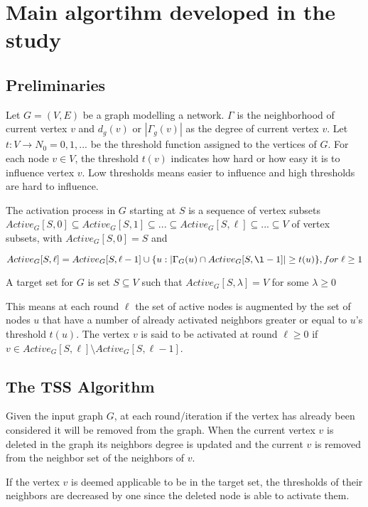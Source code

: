 \section{Main algortihm developed in the study}
\subsection{Preliminaries}
	Let $G = (V,E)$ be a graph modelling a network. $\Gamma$ is the neighborhood of current vertex $v$ and $d_{g}(v)$ or $|\Gamma_{g}(v)|$ as the degree of current vertex $v$.
	Let $t: V \rightarrow N_{0}={0,1,...}$ be the threshold function assigned to the vertices of $G$. For each node $v \in V$, the threshold $t(v)$ indicates how hard or how easy it is to influence vertex $v$. Low thresholds means easier to influence and high thresholds are hard to influence.
	
	The activation process in $G$ starting at $S$ is a sequence of vertex subsets $Active_{G}[S,0] \subseteq Active_{G}[S,1] \subseteq ... \subseteq Active_{G}[S,\ell] \subseteq ... \subseteq V$ of vertex subsets, with $Active_{G}[S,0]=S$ and 
	
	$Active_{G}[S,\ell]=Active_{G}[S,\ell-1] \cup \{u:|\Gamma_{G}(u)\cap Active_{G}[S,\l-1]|\geq t(u)\}, for \; \ell \geq 1$
	
	A target set for $G$ is set $S \subseteq V$ such that $Active_{G}[S,\lambda]=V$ for some $\lambda \geq 0$
	
	This means at each round $\ell$ the set of active nodes is augmented by the set of nodes $u$ that have a number of already activated neighbors greater or equal to $u$'s threshold $t(u)$. The vertex $v$ is said to be activated at round $\ell \ge 0$ if $v \in Active_{G}[S,\ell]\setminus Active_{G}[S,\ell-1]$.
	
	\subsection{The TSS Algorithm}
	
	Given the input graph $G$, at each round/iteration if the vertex has already been considered it will be removed from the graph. When the current vertex $v$ is deleted in the graph its neighbors degree is updated and the current $v$ is removed from the neighbor set of the neighbors of $v$.
	
	If the vertex $v$ is deemed applicable to be in the target set, the thresholds of their neighbors are decreased by one since the deleted node is able to activate them.
	
